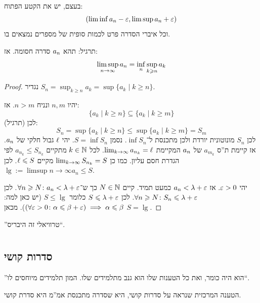 \documentclass[name=רשימות חשבון דיפרנציאלי ואינטגרלי 1א]{../../../tex/classes/megasumPreamble}
\newcommand\limssi  {\limsup_{n \to \inft}}
\begin{document}
	בעצם, יש את הקטע הפתוח:
	\[ (\liminf a_n - \eg, \limsup a_n + \eg) \]
	וכל איברי הסדרה פרט לכמות סופית של מספרים נמצאים בו.


	תרגיל: תהא $a_n$ סדרה חסומה. אז:
	\[ \limssi a_n = \inf_n \sup_{k \ge n}a_k \]
	\begin{proof}
		נגדיר $S_n = \sup_{k \ge n} a_k = \sup\{a_k \mid k \ge n\}$.

		יהיו $n, m$ ונניח $n > m$. אז:
		\[ \{a_k \mid k \ge n\} \subseteq \{a_k \mid k \ge m\} \]
		לכן (תרגיל):
		\[ S_n =\sup\{a_k \mid k \ge n\} \le \sup \{a_k \mid k \ge m\} = S_m \]
		לכן $S_n$ מונוטונית יורדת ולכן מתכנסת ל־$\inf S_n$. נסמן $S = \inf S_n$. יהי $\ell$ גבול חלקי של $a_n$. אז קיימת ת''ס $a_{m_k}$ של $a_n$ המקיימת $\lim_{k \to \infty} a_{n_k} = \ell$. לכל $k \in \mathbb{N}$ מתקיים $a_{n_k} \le S_{n_k}$ לפי הגדרת חסם עליון. כמו כן $\lim_{k \to \infty} S_{n_k} = S$ מקיים $\ell \leqslant S$. לכן $\lg := \limsup {n \to \infty} a_n \le S$.

		יהי $\eg > 0$. אז $a_n < \lg + \eg$ כמעט תמיד. קיים $N \in \mathbb{N}$ כך ש־$\forall n \ge N \co a_n < \lg + \eg$. לכן $\forall n \ge N \co S_n \le \lg + \eg$. לכן $S \le \lg + \eg$ כלומר $S \le \lg$ (יש כאן למה: $(\forall \eg > 0 \co \ag \le \bg + \eg) \implies \ag \le \bg$). מכאן $S = \lg$.
	\end{proof}

	''טרוויאלי זה היבריס``.
	
	\section[תוצאות שנשענות בכבדות על אקסיומת החסם העליון]{}
	\subsection{סדרות קושי}
	''הוא היה כומר, ואת כל הטענות שלו הוא גנב מתלמידים שלו. המון תלמידים מיוחסים לו``.

	הטענה המרכזית שנראה על סדרות קושי, היא שסדרה מתכנסת אמ''מ היא סדרת קושי.
\end{document}
